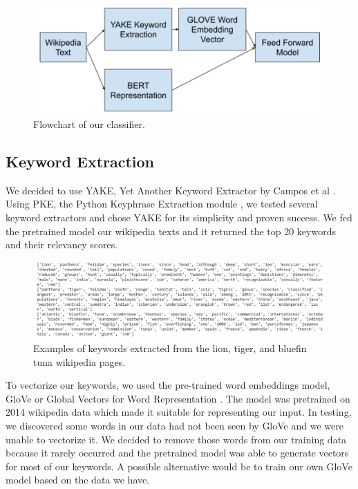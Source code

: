 \documentclass[10pt,twocolumn,letterpaper]{article}
\begin{document}
\begin{figure}[h]
  \includegraphics[width=\linewidth]{classifier_overview.png}
  \caption{Flowchart of our classifier.}
  \label{fig:classifier_overview}
\end{figure}

\subsection{Keyword Extraction}
We decided to use YAKE, Yet Another Keyword Extractor by Campos et al \cite{article}. Using PKE, the Python Keyphrase Extraction module \cite{boudin:2016:COLINGDEMO}, we tested several keyword extractors and chose YAKE for its simplicity and proven success. We fed the pretrained model our wikipedia texts and it returned the top 20 keywords and their relevancy scores. 

\begin{figure}
  \includegraphics[width=\linewidth]{keywords_example.png}
  \caption{Examples of keywords extracted from the lion, tiger, and bluefin tuna wikipedia pages.}
  \label{fig:keywords_example}
\end{figure}

To vectorize our keywords, we used the pre-trained word embeddings model, GloVe or Global Vectors for Word Representation \cite{pennington2014glove}. The model was pretrained on 2014 wikipedia data which made it suitable for representing our input. In testing, we discovered some words in our data had not been seen by GloVe and we were unable to vectorize it. We decided to remove those words from our training data because it rarely occurred and the pretrained model was able to generate vectors for most of our keywords. A possible alternative would be to train our own GloVe model based on the data we have. 
\end{document}
